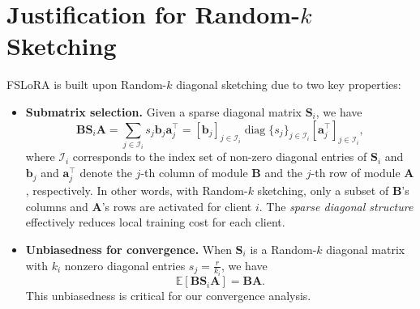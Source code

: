 \documentclass{article} %
\theoremstyle{plain}
\theoremstyle{definition}
\begin{document}
\section{Justification for Random-$k$ Sketching}\label{appen:discussion_alternative_sketching}

FSLoRA is built upon Random-$k$ diagonal sketching due to two key properties:
\begin{itemize}[leftmargin=*]
    \item \textbf{Submatrix selection.} Given a sparse diagonal matrix $\mathbf{S}_i$, we have
    \[
        \mathbf{BS}_i\mathbf{A} = \sum_{j \in \mathcal{I}_i} s_j \mathbf{b}_j \mathbf{a}_j^\top 
        = [\mathbf{b}_j]_{j \in \mathcal{I}_i} \operatorname{diag}\{s_j\}_{j \in \mathcal{I}_i} [\mathbf{a}_j^\top]_{j \in \mathcal{I}_i},
    \]
    where \(\mathcal{I}_i\) corresponds to the index set of non-zero diagonal entries of \(\mathbf{S}_i\) and $\mathbf{b}_j$ and $\mathbf{a}_j^\top$ denote the $j$-th column of module $\mathbf{B}$ and the $j$-th row of module $\mathbf{A}$, respectively.
    In other words, with Random-$k$ sketching, only a subset of $\mathbf{B}$'s columns and $\mathbf{A}$'s rows are activated for client $i$. 
    The \emph{sparse diagonal structure} effectively reduces local training cost for each client. 
    \item \textbf{Unbiasedness for convergence.} When $\mathbf{S}_i$ is a Random-$k$ diagonal matrix with $k_i$ nonzero diagonal entries $s_j = \frac{r}{k_i}$, we have 
    \[
        \mathbb{E}[\mathbf{BS}_i\mathbf{A}] = \mathbf{BA}.
    \]
    This unbiasedness is critical for our convergence analysis.
\end{itemize}

\begin{table}[h]
\centering
\caption{Accuracy comparison of Random-$k$ sketching and importance-based sketching under the commonsense reasoning benchmark with the LLaMA-3.2-3B model. Random-$k$ sketching achieves better performance.}
\small
{}
\label{tab:alternative_sketching}
\end{table}
\end{document}
